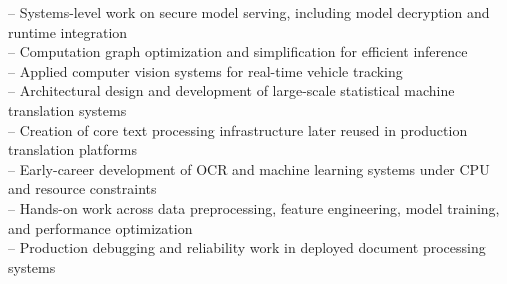 \documentclass[letterpaper, hidelinks, 11pt]{article}
\newcommand{\exprDetail}[1]{\hspace{2em} -- #1\\}
\begin{document}
\exprDetail{Systems-level work on secure model serving, including model decryption and runtime integration}
\exprDetail{Computation graph optimization and simplification for efficient inference}
\exprDetail{Applied computer vision systems for real-time vehicle tracking}

\exprDetail{Architectural design and development of large-scale statistical machine translation systems}
\exprDetail{Creation of core text processing infrastructure later reused in production translation platforms}

\exprDetail{Early-career development of OCR and machine learning systems under CPU and resource constraints}
\exprDetail{Hands-on work across data preprocessing, feature engineering, model training, and performance optimization}
\exprDetail{Production debugging and reliability work in deployed document processing systems}
\end{document}
